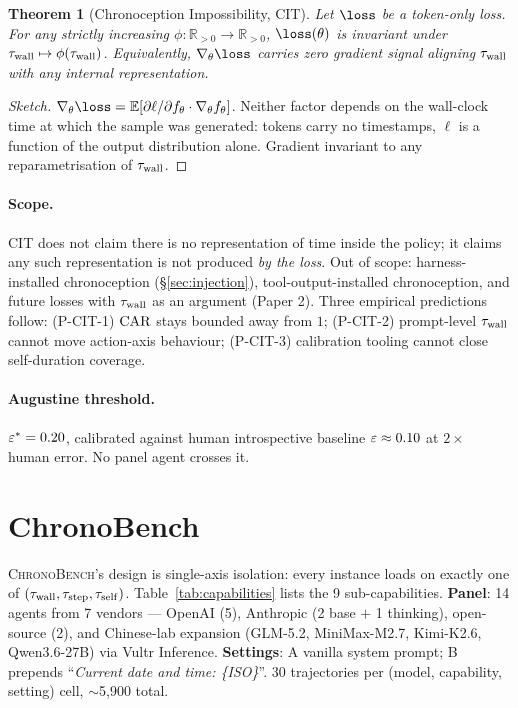 \documentclass[letterpaper]{article}
\newtheorem{theorem}{Theorem}
\begin{document}
\begin{theorem}[Chronoception Impossibility, CIT]
\label{thm:cit}
Let $\loss$ be a token-only loss. For any strictly increasing $\phi\!:\!\mathbb{R}_{>0}\!\to\!\mathbb{R}_{>0}$, $\loss(\theta)$ is invariant under $\tau_{\mathrm{wall}} \mapsto \phi(\tau_{\mathrm{wall}})$. Equivalently, $\nabla_\theta \loss$ carries zero gradient signal aligning $\tau_{\mathrm{wall}}$ with any internal representation.
\end{theorem}

\begin{proof}[Sketch]
$\nabla_\theta\loss = \mathbb{E}[\partial\ell/\partial f_\theta \cdot \nabla_\theta f_\theta]$. Neither factor depends on the wall-clock time at which the sample was generated: tokens carry no timestamps, $\ell$ is a function of the output distribution alone. Gradient invariant to any reparametrisation of $\tau_{\mathrm{wall}}$.
\end{proof}

\paragraph{Scope.} CIT does not claim there is no representation of time inside the policy; it claims any such representation is not produced \emph{by the loss}. Out of scope: harness-installed chronoception (\S\ref{sec:injection}), tool-output-installed chronoception, and future losses with $\tau_{\mathrm{wall}}$ as an argument (Paper 2). Three empirical predictions follow: (P-CIT-1) $\mathrm{CAR}$ stays bounded away from $1$; (P-CIT-2) prompt-level $\tau_{\mathrm{wall}}$ cannot move action-axis behaviour; (P-CIT-3) calibration tooling cannot close self-duration coverage.

\paragraph{Augustine threshold.} $\varepsilon^{*} = 0.20$, calibrated against human introspective baseline $\varepsilon \approx 0.10$ \citep{wittmann2009chronoception} at $2\times$ human error. No panel agent crosses it.

\section{ChronoBench}
\label{sec:bench}

\textsc{ChronoBench}'s design is single-axis isolation: every instance loads on exactly one of $(\tau_{\mathrm{wall}}, \tau_{\mathrm{step}}, \tau_{\mathrm{self}})$. Table~\ref{tab:capabilities} lists the 9 sub-capabilities. \textbf{Panel}: 14 agents from 7 vendors --- OpenAI (5), Anthropic (2 base $+$ 1 thinking), open-source (2), and Chinese-lab expansion (GLM-5.2, MiniMax-M2.7, Kimi-K2.6, Qwen3.6-27B) via Vultr Inference. \textbf{Settings}: A vanilla system prompt; B prepends ``\textit{Current date and time: \{ISO\}}''. 30 trajectories per (model, capability, setting) cell, $\sim$5,900 total.
\end{document}
